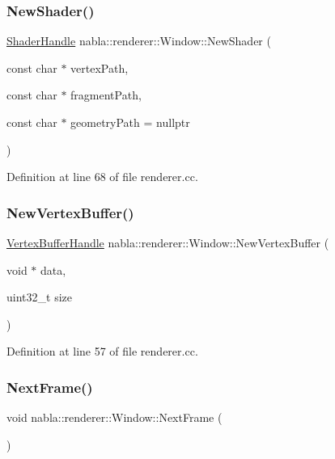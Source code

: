 \subsubsection{\texorpdfstring{NewShader()}{NewShader()}}
{\footnotesize\ttfamily \mbox{\hyperlink{namespacenabla_1_1renderer_a351c881c3df21186064938743d67dd85}{Shader\+Handle}} nabla\+::renderer\+::\+Window\+::\+New\+Shader (\begin{DoxyParamCaption}\item[{const char $\ast$}]{vertex\+Path,  }\item[{const char $\ast$}]{fragment\+Path,  }\item[{const char $\ast$}]{geometry\+Path = {\ttfamily nullptr} }\end{DoxyParamCaption})}



Definition at line 68 of file renderer.\+cc.

\mbox{\label{classnabla_1_1renderer_1_1_window_abff185d5dd091f47bdc71d134e5b006a}} 
\subsubsection{\texorpdfstring{NewVertexBuffer()}{NewVertexBuffer()}}
{\footnotesize\ttfamily \mbox{\hyperlink{namespacenabla_1_1renderer_aa901f31283abb372f2a5ca3b90e09f54}{Vertex\+Buffer\+Handle}} nabla\+::renderer\+::\+Window\+::\+New\+Vertex\+Buffer (\begin{DoxyParamCaption}\item[{void $\ast$}]{data,  }\item[{uint32\+\_\+t}]{size }\end{DoxyParamCaption})\hspace{0.3cm}{\ttfamily [inline]}}



Definition at line 57 of file renderer.\+cc.

\mbox{\label{classnabla_1_1renderer_1_1_window_ae1f5cf28387cf2ed2501d845ddb54818}} 
\subsubsection{\texorpdfstring{NextFrame()}{NextFrame()}}
{\footnotesize\ttfamily void nabla\+::renderer\+::\+Window\+::\+Next\+Frame (\begin{DoxyParamCaption}{ }\end{DoxyParamCaption})}



